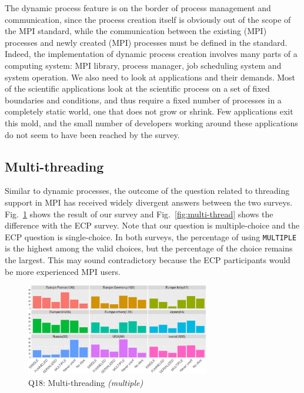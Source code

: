 \documentclass[preprint,5p,times]{elsarticle}
\def\myquote#1{{\it #1}}
\newcommand{\revision}[2]{{\color{blue}#2}}
\begin{document}
The dynamic process feature is on the border of process management and
communication, since the process creation itself is obviously out of the scope
of the MPI standard, while the communication between the existing (MPI)
processes and newly created (MPI) processes must be defined in the standard.
Indeed, the implementation of dynamic process creation \revision{spreads}{involves} many parts of a
computing system: MPI library, process manager, job scheduling system and system
operation.
%
We also need to look at applications and their demands. Most of the
scientific applications look at the scientific process on a set of fixed
boundaries and conditions, and thus require a fixed number of processes in a
completely static world, one that does not grow or shrink. Few applications exit
this mold, and the small number of developers working around these applications
do not seem to have been reached by the survey.


\subsection{Multi-threading}\label{sec:mutil-threading}

Similar to dynamic processes, the outcome of the question related to threading
support in MPI has received widely divergent answers between the two surveys.
Fig.~\ref{fig:multi-thread-reg} shows the result of our survey and
Fig.~\ref{fig:multi-thread} shows the difference with the ECP survey. Note that
our question is multiple-choice and the ECP question is single-choice. In both
surveys, the percentage of using {\tt MULTIPLE} is the highest among the valid
choices, but the percentage of the choice \revision{\myquote{I don't know}}{\myquote{No idea}} remains the
largest. This may sound contradictory because the ECP participants would be more
experienced MPI users.

\begin{figure}[tb]
  \begin{center}
    \includegraphics[width=8.0cm]{R-scripts/Q18.pdf}
    \vspace{-1.5mm}
    \caption{Q18: Multi-threading {\it(multiple)}}
    \label{fig:multi-thread-reg}
\vspace{-3mm}%
  \end{center}
\end{figure}
\end{document}
